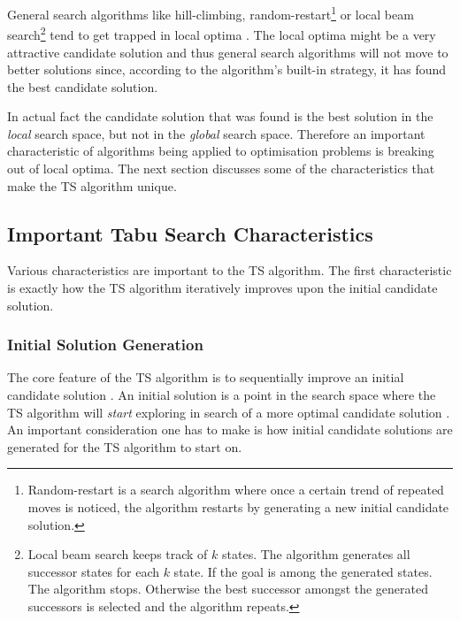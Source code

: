 General search algorithms like hill-climbing, random-restart\footnote{Random-restart is a search algorithm where once a certain trend of repeated moves is noticed, the algorithm restarts by generating a new initial candidate solution\cite{AIModernApproach}.} or local beam search\footnote{Local beam search keeps track of $k$ states. The algorithm generates all successor states for each $k$ state. If the goal is among the generated states. The algorithm stops. Otherwise the best successor amongst the generated successors is selected and the algorithm repeats\cite{AIModernApproach}.} tend to get trapped in local optima \cite{AIModernApproach}. The local optima might be a very attractive candidate solution and thus general search algorithms will not move to better solutions since, according to the algorithm's built-in strategy, it has found the best candidate solution. 

In actual fact the candidate solution that was found is the best solution in the \emph{local} search space, but not in the \emph{global} search space\cite{CompuIntelligenceIntro,AIModernApproach}. Therefore an important characteristic of algorithms being applied to optimisation problems is breaking out of local optima\cite{CompuIntelligenceIntro,AIModernApproach}.
The next section discusses some of the characteristics that make the \gls{TS} algorithm unique.

\subsection{Important Tabu Search Characteristics}
\label{sec:TScharacteristics}
Various characteristics are important to the \gls{TS} algorithm. The first characteristic is exactly how the \gls{TS} algorithm iteratively improves upon the initial candidate solution.

\subsubsection{Initial Solution Generation}
The core feature of the \gls{TS} algorithm is to sequentially improve an initial candidate solution \cite{TSHazardous}. An initial solution is a point in the search space where the \gls{TS} algorithm will \emph{start} exploring in search of a more optimal candidate solution \cite{AIModernApproach,TSHazardous}.
An important consideration one has to make is how initial candidate solutions are generated for the \gls{TS} algorithm to start on\cite{AIModernApproach,TSHazardous}.

